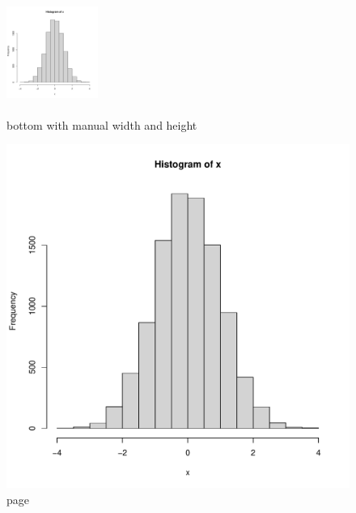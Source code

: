 \documentclass[11pt]{article}
\theoremstyle{quest}
\begin{document}
\begin{figure}[b]  
\centering 
\includegraphics[width=3cm, height=4cm]{figs/normal.pdf} 
\caption{ 
  bottom with manual width and height
}
\end{figure}

\begin{figure}[p!]  
\centering 
\includegraphics[scale=0.7]{figs/normal.pdf} 
\caption{ 
  page 
}
\end{figure}
\end{document}
